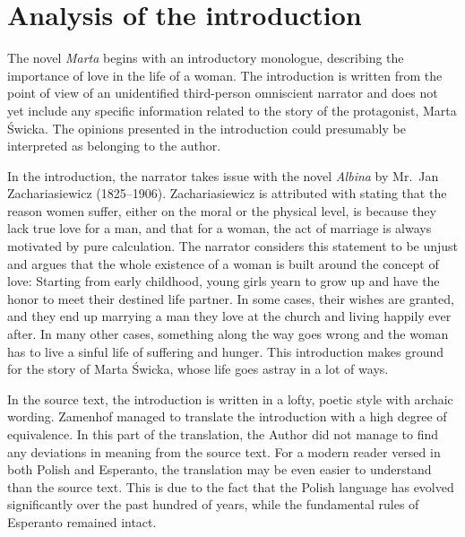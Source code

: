\section{Analysis of the introduction}

The novel \textit{Marta} begins with an introductory monologue, describing the importance of love in the life of a woman.
The introduction is written from the point of view of an unidentified third-person omniscient narrator and does not yet include any specific information related to the story of the protagonist, Marta Świcka.
The opinions presented in the introduction could presumably be interpreted as belonging to the author.

In the introduction, the narrator takes issue with the novel \textit{Albina} by Mr.\ Jan Zachariasiewicz (1825--1906).
Zachariasiewicz is attributed with stating that the reason women suffer, either on the moral or the physical level, is because they lack true love for a man, and that for a woman, the act of marriage is always motivated by pure calculation.
The narrator considers this statement to be unjust and argues that the whole existence of a woman is built around the concept of love:
Starting from early childhood, young girls yearn to grow up and have the honor to meet their destined life partner.
In some cases, their wishes are granted, and they end up marrying a man they love at the church and living happily ever after.
In many other cases, something along the way goes wrong and the woman has to live a sinful life of suffering and hunger.
This introduction makes ground for the story of Marta Świcka, whose life goes astray in a lot of ways.

In the source text, the introduction is written in a lofty, poetic style with archaic wording.
Zamenhof managed to translate the introduction with a high degree of equivalence.
In this part of the translation, the Author did not manage to find any deviations in meaning from the source text.
For a modern reader versed in both Polish and Esperanto, the translation may be even easier to understand than the source text.
This is due to the fact that the Polish language has evolved significantly over the past hundred of years, while the fundamental rules of Esperanto remained intact.




